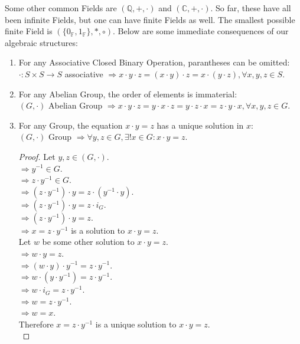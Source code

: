 \documentclass{article}
\begin{document}
			Some other common Fields are $(\mathbb{Q}, +, \cdot)$ and $(\mathbb{C}, +, \cdot)$. 
			So far, these have all been infinite Fields, but one can have finite Fields as well.
			The smallest possible finite Field is $(\{0_\mathbb{F}, 1_\mathbb{F} \}, *, \circ)$. Below are some immediate consequences of our algebraic structures:
			\begin{enumerate}
				\item For any Associative Closed Binary Operation, parantheses can be omitted:
				$\cdot \colon S \times S \to S$ associative $\Rightarrow x \cdot y \cdot z = (x \cdot y) \cdot z = x \cdot (y \cdot z), \forall x, y, z \in S$.
				
				\item For any Abelian Group, the order of elements is immaterial: \\
				$(G, \cdot)$  Abelian Group $\Rightarrow x \cdot y \cdot z = y \cdot x \cdot z = y \cdot z \cdot x = z \cdot y \cdot x, \forall x, y, z \in G$.
				
				\item For any Group, the equation $x \cdot y = z$ has a unique solution in $x$: \\
				$(G, \cdot)$ Group $\Rightarrow \forall y, z \in G, \exists! x \in G: x \cdot y = z$.
				\begin{proof}
					Let $y, z \in (G, \cdot)$. \\
					$\Rightarrow y^{-1} \in G$. \\
					$\Rightarrow z \cdot y^{-1} \in G$. \\
					$\Rightarrow (z \cdot y^{-1}) \cdot y = z \cdot (y^{-1} \cdot y)$. \\
					$\Rightarrow (z \cdot y^{-1}) \cdot y = z \cdot i_G$. \\
					$\Rightarrow (z \cdot y^{-1}) \cdot y = z$. \\
					$\Rightarrow x = z \cdot y^{-1}$ is a solution to $x \cdot y = z$. \\
					Let $w$ be some other solution to $x \cdot y = z$. \\
					$\Rightarrow w \cdot y = z$. \\
					$\Rightarrow (w \cdot y) \cdot y^{-1} = z \cdot y^{-1}$. \\
					$\Rightarrow w \cdot (y \cdot y^{-1}) = z \cdot y^{-1}$. \\
					$\Rightarrow w \cdot i_G = z \cdot y^{-1}$. \\
					$\Rightarrow w = z \cdot y^{-1}$. \\
					$\Rightarrow w = x$. \\
					Therefore $ x = z \cdot y^{-1}$ is a unique solution to $x \cdot y = z$. \\		
				\end{proof}


\end{enumerate}
\end{document}

